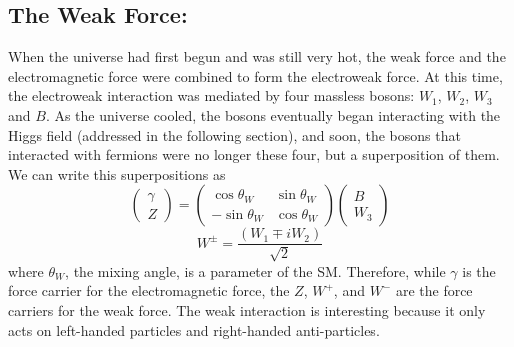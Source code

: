 \subsection{The Weak Force:}
When the universe had first begun and was still very hot, the weak force and the electromagnetic force were combined to form the electroweak force. At this time, the electroweak interaction was mediated by four massless bosons: $W_1$, $W_2$, $W_3$ and $B$. As the universe cooled, the bosons eventually began interacting with the Higgs field (addressed in the following section), and soon, the bosons that interacted with fermions were no longer these four, but a superposition of them. 
We can write this superpositions as
\begin{equation}
    \left( \begin{array}{c} \gamma \\ Z \end{array} \right) = \left( \begin{array}{c} \cos\theta_W \\ -\sin\theta_W \end{array} \begin{array}{c} \sin\theta_W \\ \cos\theta_W \end{array} \right) \left( \begin{array}{c} B \\ W_3 \end{array} \right)
\end{equation}
    \begin{equation}
    W^\pm = \frac{(W_1\mp iW_2)}{\sqrt{2}}
\end{equation}
where $\theta_W$, the mixing angle, is a parameter of the SM. Therefore, while $\gamma$ is the force carrier for the electromagnetic force, the $Z$, $W^{+}$, and $W^{-}$ are the force carriers for the weak force. The weak interaction is interesting because it only acts on left-handed particles and right-handed anti-particles.


